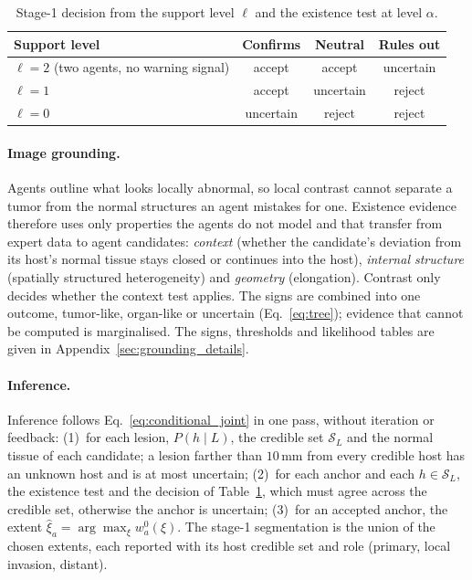 \documentclass[fleqn,10pt]{olplainarticle}
\begin{document}
\begin{table}[t]
\centering\small
\caption{Stage-1 decision from the support level $\ell$ and the existence test at level $\alpha$.}
\label{tab:decision}
\begin{tabular}{lccc}
\hline
Support level & Confirms & Neutral & Rules out\\
\hline
$\ell=2$ (two agents, no warning signal) & accept & accept & uncertain\\
$\ell=1$ & accept & uncertain & reject\\
$\ell=0$ & uncertain & reject & reject\\
\hline
\end{tabular}
\end{table}

\paragraph{Image grounding.} Agents outline what looks locally abnormal, so local contrast cannot separate a tumor from the
normal structures an agent mistakes for one. Existence evidence therefore uses only properties the agents do not model and
that transfer from expert data to agent candidates: \emph{context} (whether the candidate's deviation from its host's normal
tissue stays closed or continues into the host), \emph{internal structure} (spatially structured heterogeneity) and
\emph{geometry} (elongation). Contrast only decides whether the context test applies. The signs are combined into one
outcome, tumor-like, organ-like or uncertain (Eq.~\eqref{eq:tree}); evidence that cannot be computed is marginalised.
The signs, thresholds and likelihood tables are given in Appendix~\ref{sec:grounding_details}.

\paragraph{Inference.} Inference follows Eq.~\eqref{eq:conditional_joint} in one pass, without iteration or feedback:
(1)~for each lesion, $P(h\mid L)$, the credible set $\mathcal{S}_L$ and the normal tissue of each candidate; a lesion farther
than $10$\,mm from every credible host has an unknown host and is at most uncertain; (2)~for each anchor and each
$h\in\mathcal{S}_L$, the existence test and the decision of Table~\ref{tab:decision}, which must agree across the credible
set, otherwise the anchor is uncertain; (3)~for an accepted anchor, the extent $\hat\xi_a=\arg\max_\xi w^0_a(\xi)$. The
stage-1 segmentation is the union of the chosen extents, each reported with its host credible set and role (primary, local
invasion, distant).
\end{document}
